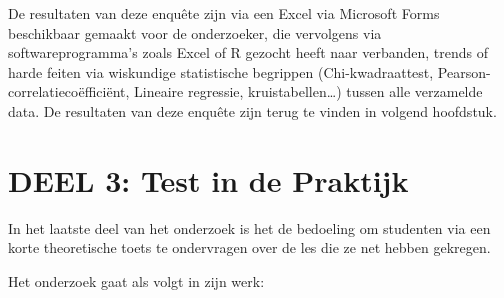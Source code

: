 De resultaten van deze enquête zijn via een Excel via Microsoft Forms beschikbaar gemaakt voor de onderzoeker, die vervolgens via softwareprogramma’s zoals Excel of R gezocht heeft naar verbanden, trends of harde feiten via wiskundige statistische begrippen (Chi-kwadraattest, Pearson-correlatiecoëfficiënt, Lineaire regressie, kruistabellen…) tussen alle verzamelde data. De resultaten van deze enquête zijn terug te vinden in volgend hoofdstuk.

\section{DEEL 3: Test in de Praktijk}
\label{sec:praktijk}

In het laatste deel van het onderzoek is het de bedoeling om studenten via een korte theoretische toets te ondervragen over de les die ze net hebben gekregen.

Het onderzoek gaat als volgt in zijn werk:

